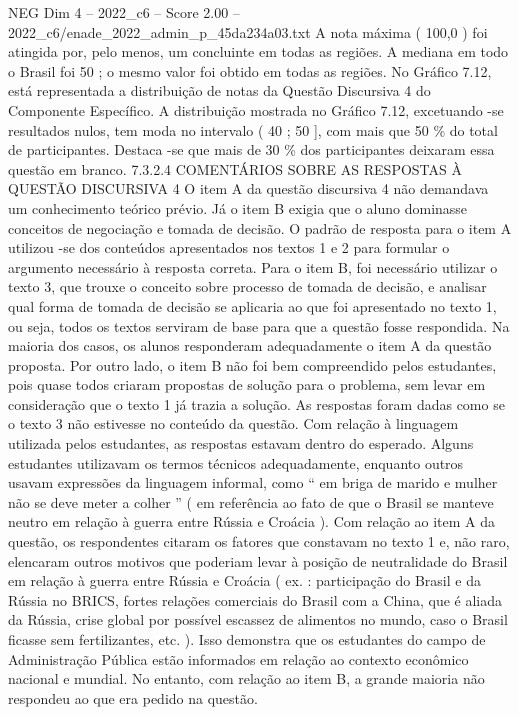 \begin{textsample}{NEG Dim 4 – 2022\_c6 – Score 2.00 – 2022\_c6/enade\_2022\_admin\_p\_45da234a03.txt}
A nota máxima ( 100,0 ) foi atingida por, pelo menos, um concluinte em todas as regiões.
A mediana em todo o Brasil foi 50 ; o mesmo valor foi obtido em todas as regiões.
No Gráfico 7.12, está representada a distribuição de notas da Questão Discursiva 4 do Componente Específico.
A distribuição mostrada no Gráfico 7.12, excetuando -se resultados nulos, tem moda no intervalo ( 40 ; 50 ], com mais que 50 \% do total de participantes.
Destaca -se que mais de 30 \% dos participantes deixaram essa questão em branco. 7.3.2.4 COMENTÁRIOS SOBRE AS RESPOSTAS À QUESTÃO DISCURSIVA 4 O item A da questão discursiva 4 não demandava um conhecimento teórico prévio.
Já o item B exigia que o aluno dominasse conceitos de negociação e tomada de decisão.
O padrão de resposta para o item A utilizou -se dos conteúdos apresentados nos textos 1 e 2 para formular o argumento necessário à resposta correta.
Para o item B, foi necessário utilizar o texto 3, que trouxe o conceito sobre processo de tomada de decisão, e analisar qual forma de tomada de decisão se aplicaria ao que foi apresentado no texto 1, ou seja, todos os textos serviram de base para que a questão fosse respondida.
Na maioria dos casos, os alunos responderam adequadamente o item A da questão proposta.
Por outro lado, o item B não foi bem compreendido pelos estudantes, pois quase todos criaram propostas de solução para o problema, sem levar em consideração que o texto 1 já trazia a solução.
As respostas foram dadas como se o texto 3 não estivesse no conteúdo da questão.
Com relação à linguagem utilizada pelos estudantes, as respostas estavam dentro do esperado.
Alguns estudantes utilizavam os termos técnicos adequadamente, enquanto outros usavam expressões da linguagem informal, como “ em briga de marido e mulher não se deve meter a colher ” ( em referência ao fato de que o Brasil se manteve neutro em relação à guerra entre Rússia e Croácia ).
Com relação ao item A da questão, os respondentes citaram os fatores que constavam no texto 1 e, não raro, elencaram outros motivos que poderiam levar à posição de neutralidade do Brasil em relação à guerra entre Rússia e Croácia ( ex. : participação do Brasil e da Rússia no BRICS, fortes relações comerciais do Brasil com a China, que é aliada da Rússia, crise global por possível escassez de alimentos no mundo, caso o Brasil ficasse sem fertilizantes, etc. ).
Isso demonstra que os estudantes do campo de Administração Pública estão informados em relação ao contexto econômico nacional e mundial.
No entanto, com relação ao item B, a grande maioria não respondeu ao que era pedido na questão.

\end{textsample}
